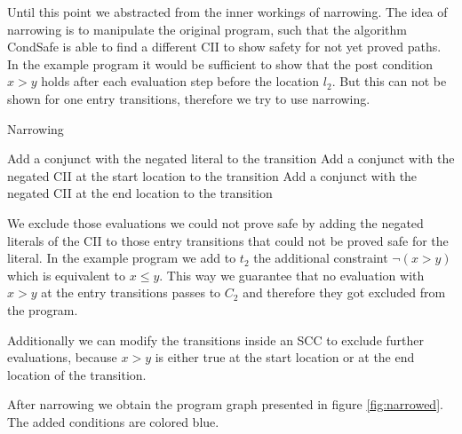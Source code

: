 Until this point we abstracted from the inner workings of narrowing.
The idea of narrowing is to manipulate the original program, such that the algorithm CondSafe is able to find a different CII to show safety for not yet proved paths.
In the example program it would be sufficient to show that the post condition $x > y$ holds after each evaluation step before the location $l_2$.
But this can not be shown for one entry transitions, therefore we try to use narrowing.

\begin{algorithm}
\caption{Narrowing}\label{narrowing}
\begin{algorithmic}[1]
        \State Add a conjunct with the negated literal to the transition
      \EndIf
    \EndFor
  \EndFor
    \State Add a conjunct with the negated CII at the start location to the transition
    \State Add a conjunct with the negated CII at the end location to the transition
  \EndFor
\end{algorithmic}
\end{algorithm}

We exclude those evaluations we could not prove safe by adding the negated literals of the CII to those entry transitions that could not be proved safe for the literal.
In the example program we add to $t_2$ the additional constraint $\neg (x > y)$ which is equivalent to $x \leq y$.
This way we guarantee that no evaluation with $x > y$ at the entry transitions passes to $C_2$ and therefore they got excluded from the program.

Additionally we can modify the transitions inside an SCC to exclude further evaluations, because $x > y$ is either true at the start location or at the end location of the transition.

After narrowing we obtain the program graph presented in figure \ref{fig:narrowed}. The added conditions are colored blue.

